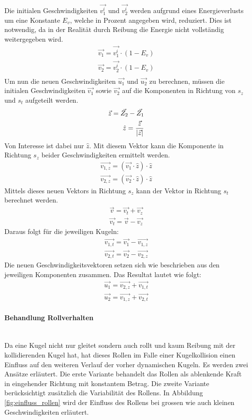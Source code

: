 Die initialen Geschwindigkeiten $\vec{v^i_1}$ und $\vec{v^i_2}$ werden aufgrund eines Energieverlusts um eine
Konstante $E_v$, welche in Prozent angegeben wird, reduziert. Dies ist notwendig, da in der Realität durch Reibung
die Energie nicht vollständig weitergegeben wird.
\begin{align}
    \vec{v_1} = \vec{v^i_1} \cdot (1 - E_v)\\
    \vec{v_2} = \vec{v^i_2} \cdot (1 - E_v)\\
\end{align}
Um nun die neuen Geschwindigkeiten $\vec{u_1}$ und $\vec{u_2}$ zu berechnen, müssen die initialen Geschwindigkeiten
$\vec{v_1}$ sowie $\vec{v_2}$ auf die Komponenten in Richtung von $s_z$ und $s_t$ aufgeteilt werden.
\begin{align}
    \vec{z} = \vec{Z_2} - \vec{Z_1}\\
    \hat{z} = \frac{\vec{z}}{\lvert \vec{z} \rvert}
\end{align}
Von Interesse ist dabei nur $\hat{z}$.
Mit diesem Vektor kann die Komponente in Richtung $s_z$ beider Geschwindigkeiten ermittelt werden.
\begin{align}
    \vec{v_{1,z}} = (\vec{v_1} \cdot \hat{z}) \cdot \hat{z}\\
    \vec{v_{2,z}} = (\vec{v_2} \cdot \hat{z}) \cdot \hat{z}
\end{align}
Mittels dieses neuen Vektors in Richtung $s_z$ kann der Vektor in Richtung $s_t$ berechnet werden.
\begin{align}
    \vec{v} = \vec{v_t} + \vec{v_z}\\
    \vec{v_t} = \vec{v} - \vec{v_z}
\end{align}
Daraus folgt für die jeweiligen Kugeln:
\begin{align}
    \vec{v_{1,t}} = \vec{v_1} - \vec{v_{1,z}}\\
    \vec{v_{2,t}} = \vec{v_2} - \vec{v_{2,z}}
\end{align}
Die neuen Geschwindigkeitsvektoren setzen sich wie beschrieben aus den jeweiligen Komponenten zusammen.
Das Resultat lautet wie folgt:
\begin{align}
    \vec{u_1} = \vec{v_{2,z}} + \vec{v_{1,t}}\\
    \vec{u_2} = \vec{v_{1,z}} + \vec{v_{2,t}}
\end{align}

\paragraph{Behandlung Rollverhalten} \hfill \\
Da eine Kugel nicht nur gleitet sondern auch rollt und kaum Reibung mit der kollidierenden Kugel hat, hat dieses Rollen im
Falle einer Kugelkollision einen Einfluss auf den weiteren Verlauf der vorher dynamischen Kugeln.
Es werden zwei Ansätze erläutert. Die erste Variante behandelt das Rollen als ablenkende Kraft in eingehender Richtung mit konstantem Betrag.
Die zweite Variante berücksichtigt zusätzlich die Variabilität des Rollens. In Abbildung \ref{fig:einfluss_rollen} wird der Einfluss des
Rollens bei grossen wie auch kleinen Geschwindigkeiten erläutert.


